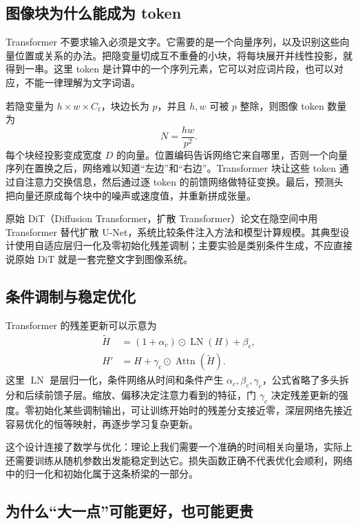 \subsection{图像块为什么能成为 token}

Transformer 不要求输入必须是文字。它需要的是一个向量序列，以及识别这些向量位置或关系的办法。把隐变量切成互不重叠的小块，将每块展开并线性投影，就得到一串。这里 token 是计算中的一个序列元素，它可以对应词片段，也可以对应，不能一律理解为文字词语。

若隐变量为 $h\times w\times C_\ell$，块边长为 $p$，并且 $h,w$ 可被 $p$ 整除，则图像 token 数量为
\begin{equation}
N=\frac{hw}{p^2}.
\label{eq:application-token-count}
\end{equation}
每个块经投影变成宽度 $D$ 的向量。位置编码告诉网络它来自哪里，否则一个向量序列在置换之后，网络难以知道“左边”和“右边”。Transformer 块让这些 token 通过自注意力交换信息，然后通过逐 token 的前馈网络做特征变换。最后，预测头把向量还原成每个块中的噪声或速度值，并重新拼成张量。

原始 DiT（Diffusion Transformer，扩散 Transformer）论文在隐空间中用 Transformer 替代扩散 U-Net，系统比较条件注入方法和模型计算规模。其典型设计使用自适应层归一化及零初始化残差调制；主要实验是类别条件生成，不应直接说原始 DiT 就是一套完整文字到图像系统。\cite{a_dit}

\subsection{条件调制与稳定优化}

Transformer 的残差更新可以示意为
\begin{align}
\widetilde H&=(1+\alpha_c)\odot\operatorname{LN}(H)+\beta_c,\\
H'&=H+\gamma_c\odot\operatorname{Attn}(\widetilde H).
\label{eq:application-adaln}
\end{align}
这里 $\operatorname{LN}$ 是层归一化，条件网络从时间和条件产生 $\alpha_c,\beta_c,\gamma_c$，公式省略了多头拆分和后续前馈子层。缩放、偏移决定注意力看到的特征，门 $\gamma_c$ 决定残差更新的强度。零初始化某些调制输出，可让训练开始时的残差分支接近零，深层网络先接近容易优化的恒等映射，再逐步学习复杂更新。

这个设计连接了数学与优化：理论上我们需要一个准确的时间相关向量场，实际上还需要训练从随机参数出发能稳定到达它。损失函数正确不代表优化会顺利，网络中的归一化和初始化属于这条桥梁的一部分。

\subsection{为什么“大一点”可能更好，也可能更贵}

